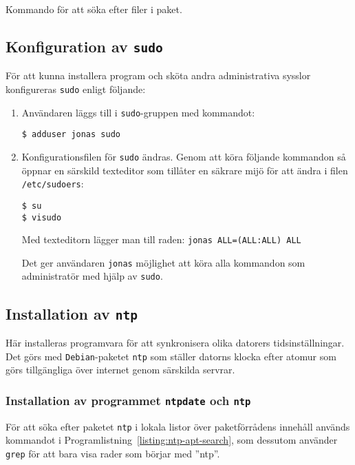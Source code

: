 \begin{listing}[H]
\caption{Kommando för att söka efter filer i paket.}
\label{listing:dpkg-search}
\end{listing}


\subsection{Konfiguration av \texttt{sudo}}
För att kunna installera program och sköta andra administrativa sysslor
konfigureras \texttt{sudo} enligt följande:

\begin{enumerate}
  \item Användaren läggs till i \texttt{sudo}-gruppen med kommandot:

        \texttt{\$ adduser jonas sudo}

  \item Konfigurationsfilen för \texttt{sudo} ändras. Genom att köra
        följande kommandon så öppnar en särskild texteditor som tillåter en
        säkrare mijö för att ändra i filen \texttt{/etc/sudoers}:
        
        \texttt{\$ su} \\
        \texttt{\$ visudo}

        Med texteditorn lägger man till raden:
        \texttt{jonas ALL=(ALL:ALL) ALL}

        Det ger användaren \texttt{jonas} möjlighet att köra alla kommandon som 
        administratör med hjälp av \texttt{sudo}.
\end{enumerate}






\subsection{Installation av \texttt{ntp}}
Här installeras programvara för att synkronisera olika datorers
tidsinställningar.  Det görs med \texttt{Debian}-paketet \texttt{ntp} som
ställer datorns klocka efter atomur som görs tillgängliga över internet genom
särskilda servrar.

\subsubsection{Installation av programmet \texttt{ntpdate} och \texttt{ntp}}
För att söka efter paketet \texttt{ntp} i lokala listor över paketförrådens
innehåll används kommandot i Programlistning~\ref{listing:ntp-apt-search},
som dessutom använder \texttt{grep} för att bara visa rader som börjar med
''ntp''.

